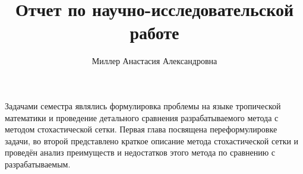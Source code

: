 \documentclass[specialist,
               substylefile = ../spbu.rtx,
               subf,href,colorlinks=true, 12pt]{disser}
\begin{document}
%
%


\title{Отчет по научно-исследовательской работе}


\author{Миллер Анастасия Александровна}


\date{\number\year}

\maketitle

\tableofcontents

\intro
	Задачами семестра являлись формулировка проблемы на языке тропической математики и проведение детального сравнения разрабатываемого метода с методом стохастической сетки. Первая глава посвящена переформулировке задачи, во второй представлено краткое описание метода стохастической сетки и проведён анализ преимуществ и недостатков этого метода по сравнению с разрабатываемым.
\end{document}
